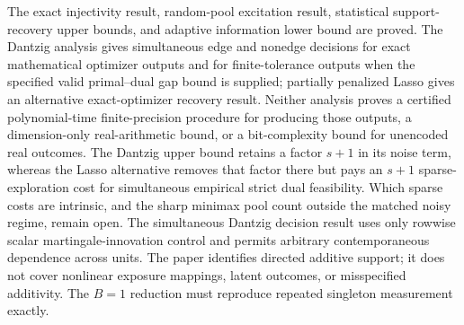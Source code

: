 \documentclass{article}
\begin{document}
The exact injectivity result, random-pool excitation result, statistical support-recovery upper bounds, and adaptive information lower bound are proved. The Dantzig analysis gives simultaneous edge and nonedge decisions for exact mathematical optimizer outputs and for finite-tolerance outputs when the specified valid primal--dual gap bound is supplied; partially penalized Lasso gives an alternative exact-optimizer recovery result. Neither analysis proves a certified polynomial-time finite-precision procedure for producing those outputs, a dimension-only real-arithmetic bound, or a bit-complexity bound for unencoded real outcomes. The Dantzig upper bound retains a factor \(s+1\) in its noise term, whereas the Lasso alternative removes that factor there but pays an \(s+1\) sparse-exploration cost for simultaneous empirical strict dual feasibility. Which sparse costs are intrinsic, and the sharp minimax pool count outside the matched noisy regime, remain open. The simultaneous Dantzig decision result uses only rowwise scalar martingale-innovation control and permits arbitrary contemporaneous dependence across units. The paper identifies directed additive support; it does not cover nonlinear exposure mappings, latent outcomes, or misspecified additivity. The \(B=1\) reduction must reproduce repeated singleton measurement exactly.
\end{document}
